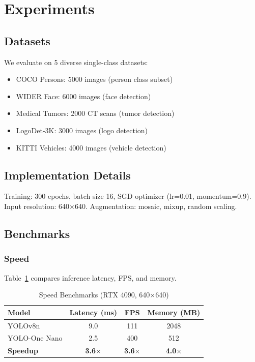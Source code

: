 \documentclass[conference]{IEEEtran}
\begin{document}

\section{Experiments}
\label{sec:experiments}

\subsection{Datasets}

We evaluate on 5 diverse single-class datasets:

\begin{itemize}
\item COCO Persons: 5000 images (person class subset)
\item WIDER Face: 6000 images (face detection)
\item Medical Tumors: 2000 CT scans (tumor detection)
\item LogoDet-3K: 3000 images (logo detection)
\item KITTI Vehicles: 4000 images (vehicle detection)
\end{itemize}

\subsection{Implementation Details}

Training: 300 epochs, batch size 16, SGD optimizer (lr=0.01, momentum=0.9). Input resolution: 640$\times$640. Augmentation: mosaic, mixup, random scaling.

\subsection{Benchmarks}

\subsubsection{Speed}

Table~\ref{tab:speed} compares inference latency, FPS, and memory.

\begin{table}[t]
\centering
\caption{Speed Benchmarks (RTX 4090, 640$\times$640)}
\label{tab:speed}
\begin{tabular}{@{}lccc@{}}
\toprule
\textbf{Model} & \textbf{Latency (ms)} & \textbf{FPS} & \textbf{Memory (MB)} \\ \midrule
YOLOv8n        & 9.0                   & 111          & 2048                 \\
YOLO-One Nano  & 2.5                   & 400          & 512                  \\
\textbf{Speedup} & \textbf{3.6$\times$} & \textbf{3.6$\times$} & \textbf{4.0$\times$} \\
\bottomrule
\end{tabular}
\end{table}
\end{document}
